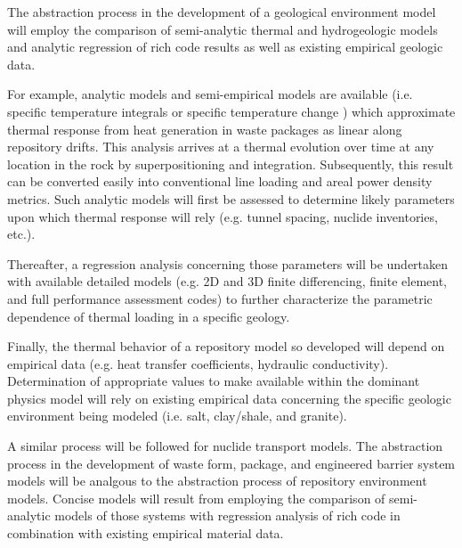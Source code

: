 The abstraction process in the development of a geological environment 
model will employ the comparison of semi-analytic thermal and 
hydrogeologic models and analytic regression of rich code results as 
well as existing empirical geologic data.  

For example, analytic models and semi-empirical models are available 
(i.e. specific temperature integrals \cite{li_methodology_2006} or 
specific temperature change \cite{radel_effect_2007}) which 
approximate thermal response from heat generation in waste packages as 
linear along repository drifts. This analysis arrives at a thermal 
evolution over time at any location in the rock by superpositioning 
and integration. Subsequently, this result can be converted easily 
into conventional line loading and areal power density metrics.  Such 
analytic models will first be assessed to determine likely parameters 
upon which thermal response will rely (e.g. tunnel spacing, nuclide 
inventories, etc.).

Thereafter, a regression analysis concerning those parameters will be 
undertaken with available detailed models (e.g. 2D and 3D finite 
differencing, finite element, and full performance assessment codes) 
to further characterize the parametric dependence of thermal loading 
in a specific geology.  

Finally, the thermal behavior of a repository model so developed will 
depend on empirical data (e.g.  heat transfer coefficients, hydraulic 
conductivity). Determination of appropriate values to make available 
within the dominant physics model will rely on existing empirical data 
concerning the specific geologic environment being modeled (i.e. salt, 
clay/shale, and granite). 

A similar process will be followed for nuclide transport models.  The 
abstraction process in the development of waste form, package, and 
engineered barrier system models will be analgous to the abstraction 
process of repository environment models. Concise models will result 
from employing the comparison of semi-analytic models of those systems 
with regression analysis of rich code in combination with existing 
empirical material data.

